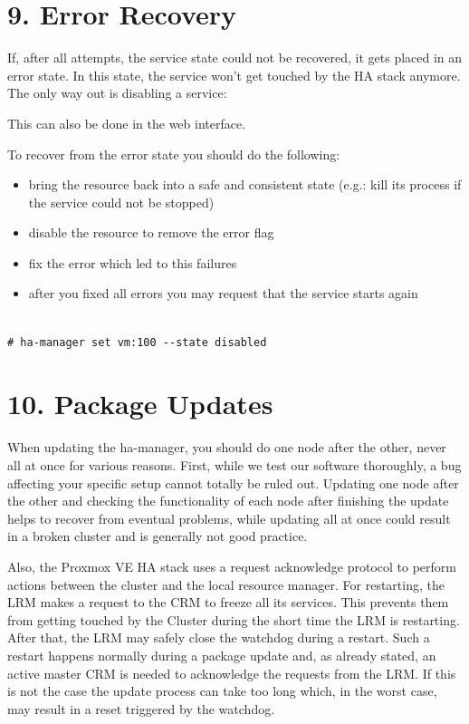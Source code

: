 \section{9. Error Recovery}

If, after all attempts, the service state could not be recovered, it gets placed in an error state. In this state, the service won’t get touched by the HA stack anymore. The only way out is disabling a service:

This can also be done in the web interface.

To recover from the error state you should do the following:

\begin{itemize}[leftmargin=2cm]

	\item bring the resource back into a safe and consistent state (e.g.: kill its process if the service could not be stopped)

	\item disable the resource to remove the error flag

	\item fix the error which led to this failures

	\item after you fixed all errors you may request that the service starts again

\end{itemize}

\begin{lstlisting}

# ha-manager set vm:100 --state disabled

\end{lstlisting}


\section{10. Package Updates}

When updating the ha-manager, you should do one node after the other, never all at once for various reasons. First, while we test our software thoroughly, a bug affecting your specific setup cannot totally be ruled out. Updating one node after the other and checking the functionality of each node after finishing the update helps to recover from eventual problems, while updating all at once could result in a broken cluster and is generally not good practice.

Also, the Proxmox VE HA stack uses a request acknowledge protocol to perform actions between the cluster and the local resource manager. For restarting, the LRM makes a request to the CRM to freeze all its services. This prevents them from getting touched by the Cluster during the short time the LRM is restarting. After that, the LRM may safely close the watchdog during a restart. Such a restart happens normally during a package update and, as already stated, an active master CRM is needed to acknowledge the requests from the LRM. If this is not the case the update process can take too long which, in the worst case, may result in a reset triggered by the watchdog.


